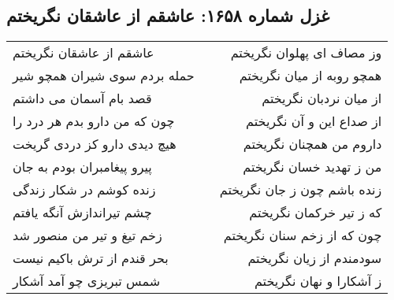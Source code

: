 \begin{center}
\section*{غزل شماره ۱۶۵۸: عاشقم از عاشقان نگریختم}
\label{sec:1658}
\begin{longtable}{l p{0.5cm} r}
عاشقم از عاشقان نگریختم
&&
وز مصاف ای پهلوان نگریختم
\\
حمله بردم سوی شیران همچو شیر
&&
همچو روبه از میان نگریختم
\\
قصد بام آسمان می داشتم
&&
از میان نردبان نگریختم
\\
چون که من دارو بدم هر درد را
&&
از صداع این و آن نگریختم
\\
هیچ دیدی دارو کز دردی گریخت
&&
داروم من همچنان نگریختم
\\
پیرو پیغامبران بودم به جان
&&
من ز تهدید خسان نگریختم
\\
زنده کوشم در شکار زندگی
&&
زنده باشم چون ز جان نگریختم
\\
چشم تیراندازش آنگه یافتم
&&
که ز تیر خرکمان نگریختم
\\
زخم تیغ و تیر من منصور شد
&&
چون که از زخم سنان نگریختم
\\
بحر قندم از ترش باکیم نیست
&&
سودمندم از زیان نگریختم
\\
شمس تبریزی چو آمد آشکار
&&
ز آشکارا و نهان نگریختم
\\
\end{longtable}
\end{center}
